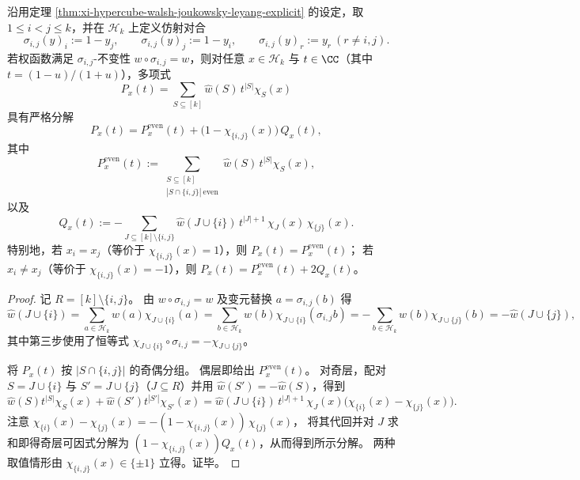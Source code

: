 \begin{theorem}\label{thm:xi-hypercube-leyang-affine-orbifold-two-layer}
沿用定理 \ref{thm:xi-hypercube-walsh-joukowsky-leyang-explicit} 的设定，取 \(1\le i<j\le k\)，并在 \(\mathcal H_k\) 上定义仿射对合
\[
\sigma_{i,j}(y)_i:=1-y_j,\qquad
\sigma_{i,j}(y)_j:=1-y_i,\qquad
\sigma_{i,j}(y)_r:=y_r\ (r\neq i,j).
\]
若权函数满足 \(\sigma_{i,j}\)-不变性 \(w\circ\sigma_{i,j}=w\)，则对任意 \(x\in\mathcal H_k\) 与 \(t\in\CC\)（其中 \(t=(1-u)/(1+u)\)），多项式
\[
P_x(t)=\sum_{S\subseteq[k]}\widehat w(S)\,t^{|S|}\chi_S(x)
\]
具有严格分解
\[
P_x(t)=P_x^{\mathrm{even}}(t)+\bigl(1-\chi_{\{i,j\}}(x)\bigr)\,Q_x(t),
\]
其中
\[
P_x^{\mathrm{even}}(t):=\sum_{\substack{S\subseteq[k]\\ |S\cap\{i,j\}|\ \mathrm{even}}}\widehat w(S)\,t^{|S|}\chi_S(x),
\]
以及
\[
Q_x(t):=-\sum_{J\subseteq[k]\setminus\{i,j\}}
\widehat w(J\cup\{i\})\,t^{|J|+1}\,\chi_J(x)\,\chi_{\{j\}}(x).
\]
特别地，若 \(x_i=x_j\)（等价于 \(\chi_{\{i,j\}}(x)=1\)），则 \(P_x(t)=P_x^{\mathrm{even}}(t)\)；
若 \(x_i\neq x_j\)（等价于 \(\chi_{\{i,j\}}(x)=-1\)），则 \(P_x(t)=P_x^{\mathrm{even}}(t)+2Q_x(t)\)。
\end{theorem}
\begin{proof}
记 \(R=[k]\setminus\{i,j\}\)。
由 \(w\circ\sigma_{i,j}=w\) 及变元替换 \(a=\sigma_{i,j}(b)\) 得
\[
\widehat w(J\cup\{i\})
=\sum_{a\in\mathcal H_k}w(a)\chi_{J\cup\{i\}}(a)
=\sum_{b\in\mathcal H_k}w(b)\chi_{J\cup\{i\}}(\sigma_{i,j}b)
=-\sum_{b\in\mathcal H_k}w(b)\chi_{J\cup\{j\}}(b)
=-\widehat w(J\cup\{j\}),
\]
其中第三步使用了恒等式 \(\chi_{J\cup\{i\}}\circ\sigma_{i,j}=-\chi_{J\cup\{j\}}\)。
\par
将 \(P_x(t)\) 按 \(|S\cap\{i,j\}|\) 的奇偶分组。
偶层即给出 \(P_x^{\mathrm{even}}(t)\)。
对奇层，配对 \(S=J\cup\{i\}\) 与 \(S'=J\cup\{j\}\)（\(J\subseteq R\)）并用 \(\widehat w(S')=-\widehat w(S)\)，得到
\[
\widehat w(S)t^{|S|}\chi_S(x)+\widehat w(S')t^{|S'|}\chi_{S'}(x)
=\widehat w(J\cup\{i\})\,t^{|J|+1}\,\chi_J(x)\bigl(\chi_{\{i\}}(x)-\chi_{\{j\}}(x)\bigr).
\]
注意
\(
\chi_{\{i\}}(x)-\chi_{\{j\}}(x)=-(1-\chi_{\{i,j\}}(x))\,\chi_{\{j\}}(x)
\)，
将其代回并对 \(J\) 求和即得奇层可因式分解为 \((1-\chi_{\{i,j\}}(x))Q_x(t)\)，从而得到所示分解。
两种取值情形由 \(\chi_{\{i,j\}}(x)\in\{\pm 1\}\) 立得。证毕。
\end{proof}

\endinput
